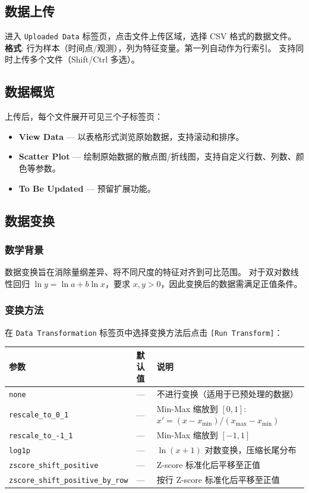 \documentclass[12pt,a4paper]{ctexart}
\makeatletter
\newcommand{\btn}[1]{\texttt{[#1]}}
\newcommand{\tab}[1]{\texttt{#1}}
\newcommand{\param}[1]{\texttt{#1}}
\newcommand{\paramtable}[1]{%
    \begin{center}
    \small
    \begin{tabular}{@{}llp{5.5cm}@{}}
    \toprule
    \textbf{参数} & \textbf{默认值} & \textbf{说明} \\
    \midrule
    #1
    \bottomrule
    \end{tabular}
    \end{center}
}
\makeatother
\begin{document}
\subsection{数据上传}

\begin{stepbox}[操作步骤]
    进入 \tab{Uploaded Data} 标签页，点击文件上传区域，选择 CSV 格式的数据文件。\\
    \textbf{格式}: 行为样本（时间点/观测），列为特征变量。第一列自动作为行索引。
    支持同时上传多个文件（Shift/Ctrl 多选）。
\end{stepbox}

\subsection{数据概览}

上传后，每个文件展开可见三个子标签页：

\begin{itemize}[leftmargin=*]
    \item \textbf{View Data} --- 以表格形式浏览原始数据，支持滚动和排序。
    \item \textbf{Scatter Plot} --- 绘制原始数据的散点图/折线图，支持自定义行数、列数、颜色等参数。
    \item \textbf{To Be Updated} --- 预留扩展功能。
\end{itemize}

\subsection{数据变换}

\subsubsection{数学背景}

数据变换旨在消除量纲差异、将不同尺度的特征对齐到可比范围。
对于双对数线性回归 $\ln y = \ln a + b \ln x$，要求 $x, y > 0$，因此变换后的数据需满足正值条件。

\subsubsection{变换方法}

在 \tab{Data Transformation} 标签页中选择变换方法后点击 \btn{Run Transform}：

\paramtable{
    \param{none} & --- & 不进行变换（适用于已预处理的数据）\\
    \param{rescale\_to\_0\_1} & --- & Min-Max 缩放到 $[0, 1]$: $x' = (x - x_{\min}) / (x_{\max} - x_{\min})$\\
    \param{rescale\_to\_-1\_1} & --- & Min-Max 缩放到 $[-1, 1]$\\
    \param{log1p} & --- & $\ln(x + 1)$ 对数变换，压缩长尾分布\\
    \param{zscore\_shift\_positive} & --- & Z-score 标准化后平移至正值\\
    \param{zscore\_shift\_positive\_by\_row} & --- & 按行 Z-score 标准化后平移至正值\\
}
\end{document}

